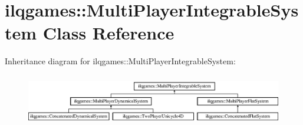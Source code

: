 \hypertarget{classilqgames_1_1_multi_player_integrable_system}{}\section{ilqgames\+:\+:Multi\+Player\+Integrable\+System Class Reference}
\label{classilqgames_1_1_multi_player_integrable_system}
Inheritance diagram for ilqgames\+:\+:Multi\+Player\+Integrable\+System\+:\begin{figure}[H]
\begin{center}
\leavevmode
\includegraphics[height=2.231076cm]{classilqgames_1_1_multi_player_integrable_system}
\end{center}
\end{figure}
